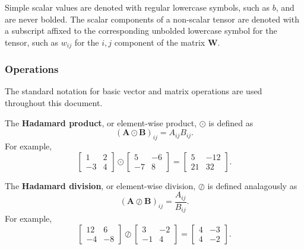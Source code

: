 \documentclass[12pt]{report}
\theoremstyle{definition}
\theoremstyle{remark}
\begin{document}
Simple scalar values are denoted with regular lowercase symbols, such as $b$, and are never bolded. The scalar components of a non-scalar tensor are denoted with a subscript affixed to the corresponding unbolded lowercase symbol for the tensor, such as $w_{ij}$ for the $i,j$ component of the matrix $\mathbf{W}$.

\subsubsection{Operations} %
The standard notation for basic vector and matrix operations are used throughout this document.

The \textbf{Hadamard product}, or element-wise product, $\odot$ is defined as
\begin{equation}
    ({{\mathbf{A} \odot \mathbf{B}}})_{ij} = A_{ij}B_{ij}.
\end{equation}
For example,
\begin{equation}
    \begin{bmatrix}
        1 & 2 \\
        -3 & 4
    \end{bmatrix} \odot \begin{bmatrix}
        5 & -6 \\
        -7 & 8
    \end{bmatrix} = \begin{bmatrix}
        5 & -12 \\
        21 & 32
    \end{bmatrix}.
\end{equation}

The \textbf{Hadamard division}, or element-wise division, $\oslash$ is defined analagously as
\begin{equation}
    ({{\mathbf{A} \oslash \mathbf{B}}})_{ij} = \frac{A_{ij}}{B_{ij}}.
\end{equation}
For example,
\begin{equation}
    \begin{bmatrix}
        12 & 6 \\
        -4 & -8
    \end{bmatrix} \oslash \begin{bmatrix}
        3 & -2 \\
        -1 & 4
    \end{bmatrix} = \begin{bmatrix}
        4 & -3 \\
        4 & -2
    \end{bmatrix}.
\end{equation}
\end{document}

